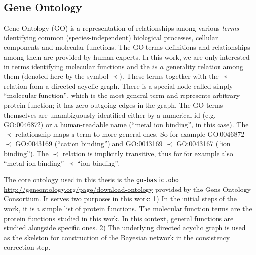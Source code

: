 \documentclass[11pt,twoside,a4paper]{book}
\begin{document}
\subsection{Gene Ontology}
\label{ssec:go}
Gene Ontology (GO) \cite{go} is a representation of relationships among various \emph{terms} identifying common (species-independent)
biological processes, cellular components and molecular functions.
The GO terms definitions and relationships among them are provided by human experts. 
In this work, we are only interested in terms identifying molecular functions and the $is\_a$ generality relation among them
(denoted here by the symbol $\prec$).
These terms together with the $\prec$ relation form a directed acyclic graph.
There is a special node called simply ``molecular function'',
which is the most general term and represents arbitrary protein function;
it has zero outgoing edges in the graph.
The GO terms themselves are unambiguously identified either by a numerical id (e.g. GO:0046872) or a human-readable name
(``metal ion binding'', in this case).
The $\prec$ relationship maps a term to more general ones. So for example GO:0046872 $\prec$ GO:0043169 (``cation binding'')
 and GO:0043169  $\prec$ GO:0043167 (``ion binding'').
 The $\prec$ relation is implicitly transitive,
 thus for for example also ``metal ion binding''  $\prec$ ``ion binding''.
 
The core ontology used in this thesis is the \texttt{go-basic.obo} \cite{gores} \url{http://geneontology.org/page/download-ontology} provided by the Gene Ontology Consortium. 
It serves two purposes in this work:
1) In the initial steps of the work, it is a simple list of protein functions.
The molecular function terms are the protein functions studied in this work.
In this context, general functions are studied alongside specific ones. 
2) The underlying directed acyclic graph is used as the skeleton for construction of the 
Bayesian network in the consistency correction step. 
\end{document}

